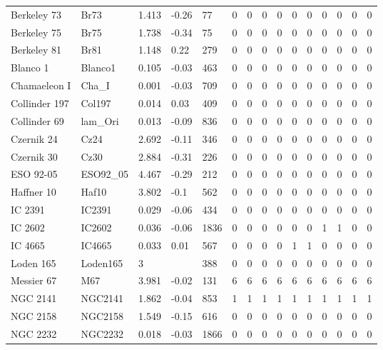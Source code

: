 \documentclass[fleqn,usenatbib]{mnras}
\begin{document}
\begin{table}
\begin{tabular}{|l l l l l || c c c c c | c c c c c|}
            Berkeley 73 & Br73 & 1.413 & -0.26 & 77 & 0 & 0 & 0 & 0 & 0 & 0 & 0 & 0 & 0 & 0\\
            Berkeley 75 & Br75 & 1.738 & -0.34 & 75 & 0 & 0 & 0 & 0 & 0 & 0 & 0 & 0 & 0 & 0\\
            Berkeley 81 & Br81 & 1.148 & 0.22 & 279 & 0 & 0 & 0 & 0 & 0 & 0 & 0 & 0 & 0 & 0\\
            Blanco 1 & Blanco1 & 0.105 & -0.03 & 463 & 0 & 0 & 0 & 0 & 0 & 0 & 0 & 0 & 0 & 0\\
            Chamaeleon I & Cha\_I & 0.001 & -0.03 & 709 & 0 & 0 & 0 & 0 & 0 & 0 & 0 & 0 & 0 & 0\\
            Collinder 197 & Col197 & 0.014 & 0.03 & 409 & 0 & 0 & 0 & 0 & 0 & 0 & 0 & 0 & 0 & 0\\
            Collinder 69 & lam\_Ori & 0.013 & -0.09 & 836 & 0 & 0 & 0 & 0 & 0 & 0 & 0 & 0 & 0 & 0\\
            Czernik 24 & Cz24 & 2.692 & -0.11 & 346 & 0 & 0 & 0 & 0 & 0 & 0 & 0 & 0 & 0 & 0\\
            Czernik 30 & Cz30 & 2.884 & -0.31 & 226 & 0 & 0 & 0 & 0 & 0 & 0 & 0 & 0 & 0 & 0\\
            ESO 92-05 & ESO92\_05 & 4.467 & -0.29 & 212 & 0 & 0 & 0 & 0 & 0 & 0 & 0 & 0 & 0 & 0\\
            Haffner 10 & Haf10 & 3.802 & -0.1 & 562 & 0 & 0 & 0 & 0 & 0 & 0 & 0 & 0 & 0 & 0\\
            IC 2391 & IC2391 & 0.029 & -0.06 & 434 & 0 & 0 & 0 & 0 & 0 & 0 & 0 & 0 & 0 & 0\\
            \rowcolor{lightgray}
            IC 2602 & IC2602 & 0.036 & -0.06 & 1836 & 0 & 0 & 0 & 0 & 0 & 0 & 1 & 1 & 0 & 0\\
            \rowcolor{lightgray}
            IC 4665 & IC4665 & 0.033 & 0.01 & 567 & 0 & 0 & 0 & 0 & 1 & 1 & 0 & 0 & 0 & 0\\
            Loden 165 & Loden165 & 3 &  & 388 & 0 & 0 & 0 & 0 & 0 & 0 & 0 & 0 & 0 & 0\\
            \rowcolor{lightgray}
            Messier 67 & M67 & 3.981 & -0.02 & 131 & 6 & 6 & 6 & 6 & 6 & 6 & 6 & 6 & 6 & 6\\
            \rowcolor{lightgray}
            NGC 2141 & NGC2141 & 1.862 & -0.04 & 853 & 1 & 1 & 1 & 1 & 1 & 1 & 1 & 1 & 1 & 1\\
            NGC 2158 & NGC2158 & 1.549 & -0.15 & 616 & 0 & 0 & 0 & 0 & 0 & 0 & 0 & 0 & 0 & 0\\
            NGC 2232 & NGC2232 & 0.018 & -0.03 & 1866 & 0 & 0 & 0 & 0 & 0 & 0 & 0 & 0 & 0 & 0\\

\end{tabular}
\end{table}
\end{document}
